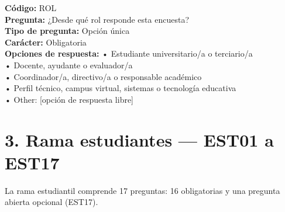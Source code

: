 \begin{infobox}\small
\textbf{\textcolor{accent}{Código:}} ROL\\
\textbf{\textcolor{accent}{Pregunta:}} ¿Desde qué rol responde esta encuesta?\\
\textbf{\textcolor{accent}{Tipo de pregunta:}} Opción única\\
\textbf{\textcolor{accent}{Carácter:}} Obligatoria\\
\textbf{\textcolor{accent}{Opciones de respuesta:}} • Estudiante universitario/a o terciario/a \\ • Docente, ayudante o evaluador/a \\ • Coordinador/a, directivo/a o responsable académico \\ • Perfil técnico, campus virtual, sistemas o tecnología educativa \\ • Other: [opción de respuesta libre]\\
\end{infobox}
\section*{3. Rama estudiantes --- EST01 a EST17}
La rama estudiantil comprende 17 preguntas: 16 obligatorias y una pregunta abierta opcional (EST17).

